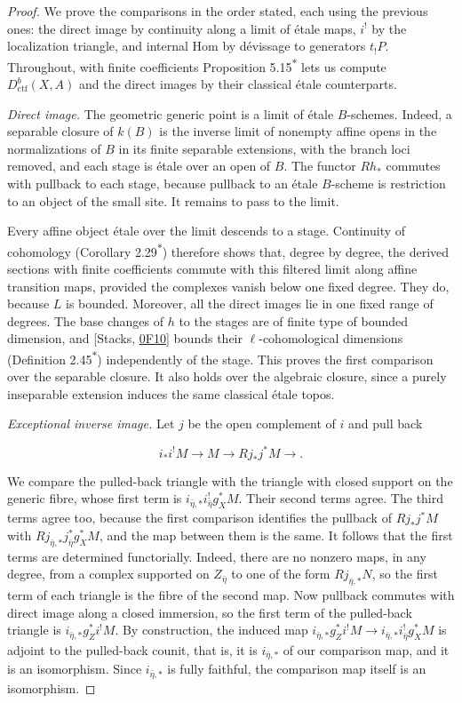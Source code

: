 \documentclass[11pt]{article}
\newcommand{\bpout}[1]{#1\textsuperscript{\hyperlink{bp-outside}{\ensuremath{\ast}}}}
\begin{document}
\begin{proof}[{Proof}]\label{bp120}%
We prove the comparisons in the order stated, each using the previous ones: the direct image by continuity along a limit of étale maps, \(i^!\) by the localization triangle, and internal Hom by dévissage to generators \(t_!P\). Throughout, with finite coefficients Proposition \bpout{5.15} lets us compute \(D^b_{\mathrm{ctf}}(X,A)\) and the direct images by their classical étale counterparts.

\emph{Direct image.} The geometric generic point is a limit of étale \(B\)-schemes. Indeed, a separable closure of \(k(B)\) is the inverse limit of nonempty affine opens in the normalizations of \(B\) in its finite separable extensions, with the branch loci removed, and each stage is étale over an open of \(B\). The functor \(Rh_*\) commutes with pullback to each stage, because pullback to an étale \(B\)-scheme is restriction to an object of the small site. It remains to pass to the limit.

Every affine object étale over the limit descends to a stage. Continuity of cohomology (Corollary \bpout{2.29}) therefore shows that, degree by degree, the derived sections with finite coefficients commute with this filtered limit along affine transition maps, provided the complexes vanish below one fixed degree. They do, because \(L\) is bounded. Moreover, all the direct images lie in one fixed range of degrees. The base changes of \(h\) to the stages are of finite type of bounded dimension, and [Stacks, \href{https://stacks.math.columbia.edu/tag/0F10}{0F10}] bounds their \(\ell\)-cohomological dimensions (Definition \bpout{2.45}) independently of the stage. This proves the first comparison over the separable closure. It also holds over the algebraic closure, since a purely inseparable extension induces the same classical étale topos.

\emph{Exceptional inverse image.} Let \(j\) be the open complement of \(i\) and pull back

\[
i_*i^!M\longrightarrow M\longrightarrow Rj_*j^*M
\longrightarrow.
\]

We compare the pulled-back triangle with the triangle with closed support on the generic fibre, whose first term is \(i_{\bar\eta,*}i_{\bar\eta}^!g_X^*M\). Their second terms agree. The third terms agree too, because the first comparison identifies the pullback of \(Rj_*j^*M\) with \(Rj_{\bar\eta,*}j_{\bar\eta}^*g_X^*M\), and the map between them is the same. It follows that the first terms are determined functorially. Indeed, there are no nonzero maps, in any degree, from a complex supported on \(Z_{\bar\eta}\) to one of the form \(Rj_{\bar\eta,*}N\), so the first term of each triangle is the fibre of the second map. Now pullback commutes with direct image along a closed immersion, so the first term of the pulled-back triangle is \(i_{\bar\eta,*}g_Z^*i^!M\). By construction, the induced map \(i_{\bar\eta,*}g_Z^*i^!M\to i_{\bar\eta,*}i_{\bar\eta}^!g_X^*M\) is adjoint to the pulled-back counit, that is, it is \(i_{\bar\eta,*}\) of our comparison map, and it is an isomorphism. Since \(i_{\bar\eta,*}\) is fully faithful, the comparison map itself is an isomorphism.


\end{proof}
\end{document}
